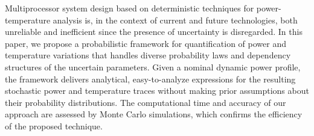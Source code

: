 Multiprocessor system design based on deterministic techniques for power-temperature analysis is, in the context of current and future technologies, both unreliable and inefficient since the presence of uncertainty is disregarded. In this paper, we propose a probabilistic framework for quantification of power and temperature variations that handles diverse probability laws and dependency structures of the uncertain parameters. Given a nominal dynamic power profile, the framework delivers analytical, easy-to-analyze expressions for the resulting stochastic power and temperature traces without making prior assumptions about their probability distributions. The computational time and accuracy of our approach are assessed by Monte Carlo simulations, which confirms the efficiency of the proposed technique.
